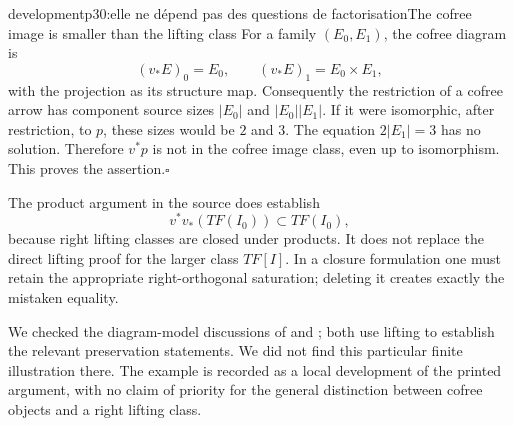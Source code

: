 \begin{dcomment}{development}{p30:elle ne dépend pas des questions de factorisation}{The cofree image is smaller than the lifting class}
For a family $(E_0,E_1)$, the cofree diagram is
\[
 (v_*E)_0=E_0,\qquad (v_*E)_1=E_0\times E_1,
\]
with the projection as its structure map. Consequently the restriction of a cofree arrow has component source sizes $|E_0|$ and $|E_0||E_1|$. If it were isomorphic, after restriction, to $p$, these sizes would be $2$ and $3$. The equation $2|E_1|=3$ has no solution. Therefore $v^*p$ is not in the cofree image class, even up to isomorphism. This proves the assertion.\hfill$\square$

The product argument in the source does establish
\[
 v^*v_*(TF(I_0))\subset TF(I_0),
\]
because right lifting classes are closed under products. It does not replace the direct lifting proof for the larger class $TF[I]$. In a closure formulation one must retain the appropriate right-orthogonal saturation; deleting it creates exactly the mistaken equality.

We checked the diagram-model discussions of \citet[§A.2.8]{Lurie2009HTT} and \citet[Corollary~1.4.22]{Cisinski2006}; both use lifting to establish the relevant preservation statements. We did not find this particular finite illustration there. The example is recorded as a local development of the printed argument, with no claim of priority for the general distinction between cofree objects and a right lifting class.
\end{dcomment}

